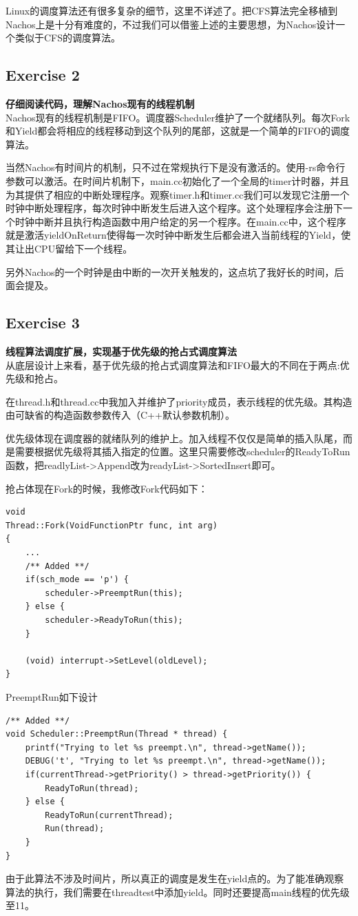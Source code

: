 \documentclass[nofonts]{ctexart}
\begin{document}
Linux的调度算法还有很多复杂的细节，这里不详述了。把CFS算法完全移植到Nachos上是十分有难度的，不过我们可以借鉴上述的主要思想，为Nachos设计一个类似于CFS的调度算法。

\subsection*{Exercise 2}
\textbf{仔细阅读代码，理解Nachos现有的线程机制}\\
Nachos现有的线程机制是FIFO。调度器Scheduler维护了一个就绪队列。每次Fork和Yield都会将相应的线程移动到这个队列的尾部，这就是一个简单的FIFO的调度算法。

当然Nachos有时间片的机制，只不过在常规执行下是没有激活的。使用-rs命令行参数可以激活。在时间片机制下，main.cc初始化了一个全局的timer计时器，并且为其提供了相应的中断处理程序。观察timer.h和timer.cc我们可以发现它注册一个时钟中断处理程序，每次时钟中断发生后进入这个程序。这个处理程序会注册下一个时钟中断并且执行构造函数中用户给定的另一个程序。在main.cc中，这个程序就是激活yieldOnReturn使得每一次时钟中断发生后都会进入当前线程的Yield，使其让出CPU留给下一个线程。

另外Nachos的一个时钟是由中断的一次开关触发的，这点坑了我好长的时间，后面会提及。

\subsection*{Exercise 3}
\textbf{线程算法调度扩展，实现基于优先级的抢占式调度算法}\\
从底层设计上来看，基于优先级的抢占式调度算法和FIFO最大的不同在于两点:优先级和抢占。

在thread.h和thread.cc中我加入并维护了priority成员，表示线程的优先级。其构造由可缺省的构造函数参数传入（C++默认参数机制）。

优先级体现在调度器的就绪队列的维护上。加入线程不仅仅是简单的插入队尾，而是需要根据优先级将其插入指定的位置。这里只需要修改scheduler的ReadyToRun函数，把readlyList->Append改为readyList->SortedInsert即可。

抢占体现在Fork的时候，我修改Fork代码如下：
\begin{lstlisting}
void 
Thread::Fork(VoidFunctionPtr func, int arg)
{
	...
    /** Added **/
    if(sch_mode == 'p') {
        scheduler->PreemptRun(this);
    } else {
        scheduler->ReadyToRun(this);
    }
    
    (void) interrupt->SetLevel(oldLevel);
}   
\end{lstlisting}
PreemptRun如下设计
\begin{lstlisting}
/** Added **/
void Scheduler::PreemptRun(Thread * thread) {
    printf("Trying to let %s preempt.\n", thread->getName());
    DEBUG('t', "Trying to let %s preempt.\n", thread->getName());
    if(currentThread->getPriority() > thread->getPriority()) {
        ReadyToRun(thread);
    } else {
        ReadyToRun(currentThread);
        Run(thread);
    }
}
\end{lstlisting}
由于此算法不涉及时间片，所以真正的调度是发生在yield点的。为了能准确观察算法的执行，我们需要在threadtest中添加yield。同时还要提高main线程的优先级至11。
\end{document}
